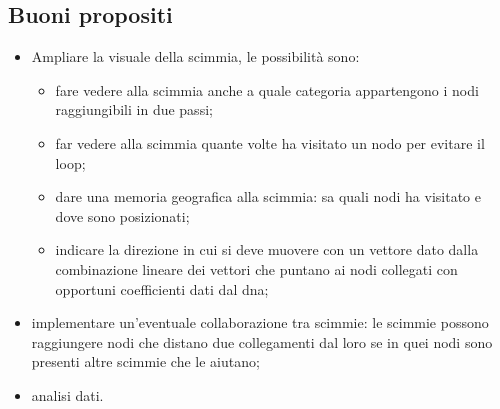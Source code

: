 \documentclass{article}
\begin{document}
\subsection{Buoni propositi}

\begin{itemize}
	\item Ampliare la visuale della scimmia, le possibilit\`{a} sono: 
	\begin{itemize}
		\item fare vedere alla scimmia anche a quale categoria appartengono i nodi raggiungibili in due passi;
		\item far vedere alla scimmia quante volte ha visitato un nodo per evitare il loop;
		\item dare una memoria geografica alla scimmia: sa quali nodi ha visitato e dove sono posizionati;
		\item indicare la direzione in cui si deve muovere con un vettore dato dalla combinazione lineare dei vettori che puntano ai nodi collegati con opportuni coefficienti dati dal dna;
	\end{itemize}
	
	\item implementare un'eventuale collaborazione tra scimmie: le scimmie possono raggiungere nodi che distano due collegamenti dal loro se in quei nodi sono presenti altre scimmie che le aiutano;
	\item analisi dati.
\end{itemize}

	
	
\end{document}
